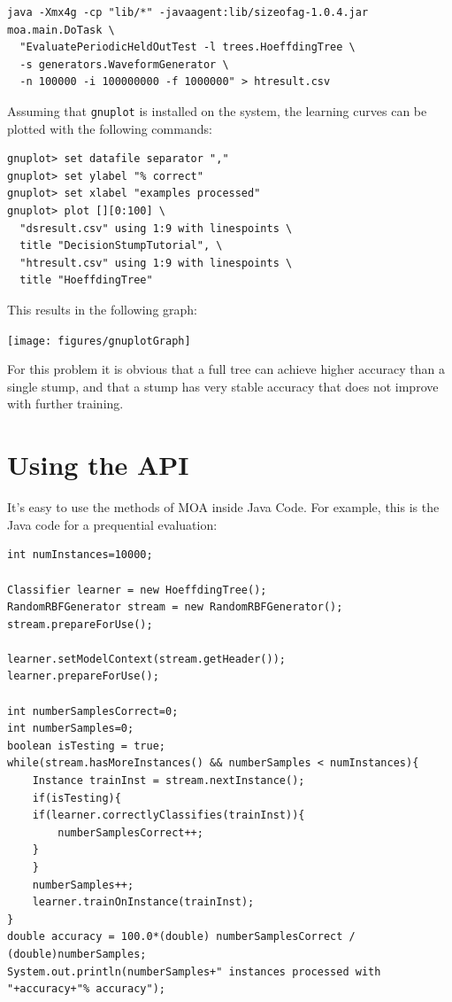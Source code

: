 \documentclass[a4paper,12pt,twoside]{book}
\begin{document}
\begin{footnotesize}\begin{verbatim}
java -Xmx4g -cp "lib/*" -javaagent:lib/sizeofag-1.0.4.jar moa.main.DoTask \
  "EvaluatePeriodicHeldOutTest -l trees.HoeffdingTree \
  -s generators.WaveformGenerator \
  -n 100000 -i 100000000 -f 1000000" > htresult.csv
\end{verbatim}\end{footnotesize}

Assuming that \verb+gnuplot+ is installed on the system, the learning curves can be plotted with the following commands:

\begin{footnotesize}\begin{verbatim}
gnuplot> set datafile separator ","
gnuplot> set ylabel "% correct"
gnuplot> set xlabel "examples processed"
gnuplot> plot [][0:100] \
  "dsresult.csv" using 1:9 with linespoints \
  title "DecisionStumpTutorial", \
  "htresult.csv" using 1:9 with linespoints \
  title "HoeffdingTree"
\end{verbatim}\end{footnotesize}

This results in the following graph:

\texttt{[image: figures/gnuplotGraph]}

For this problem it is obvious that a full tree can achieve higher accuracy than a single stump, and that a stump has very stable accuracy that does not improve with further training.



\chapter{Using the API} %

It's easy to use the methods of MOA inside Java Code. For example, this is the Java code for a prequential evaluation:

\begin{lstlisting}[caption={Java Code Example},label=lst:fullclassifier]
int numInstances=10000;

Classifier learner = new HoeffdingTree();
RandomRBFGenerator stream = new RandomRBFGenerator();
stream.prepareForUse();

learner.setModelContext(stream.getHeader());
learner.prepareForUse();

int numberSamplesCorrect=0;
int numberSamples=0;
boolean isTesting = true;
while(stream.hasMoreInstances() && numberSamples < numInstances){
    Instance trainInst = stream.nextInstance();
    if(isTesting){
	if(learner.correctlyClassifies(trainInst)){
	    numberSamplesCorrect++;
	}
    }
    numberSamples++;
    learner.trainOnInstance(trainInst);
}
double accuracy = 100.0*(double) numberSamplesCorrect / (double)numberSamples;
System.out.println(numberSamples+" instances processed with "+accuracy+"% accuracy");
\end{lstlisting}
\end{document}
